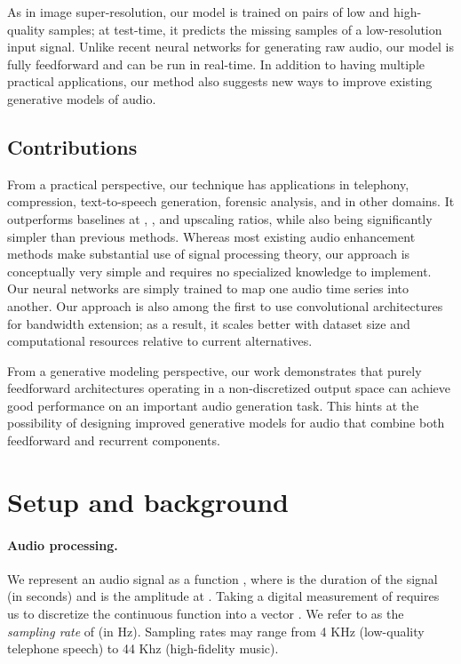 \documentclass{article} \usepackage{iclr2017_workshop,times}
\begin{document}
As in image super-resolution, our model is trained on pairs of low and high-quality samples; at test-time, it predicts the missing samples of a low-resolution input signal. Unlike recent neural networks for generating raw audio, our model is fully feedforward and can be run in real-time. In addition to having multiple practical applications, our method also suggests new ways to improve existing generative models of audio.

\subsection{Contributions}



From a practical perspective, our technique has applications in telephony, compression, text-to-speech generation, forensic analysis, and in other domains. It outperforms baselines at , , and  upscaling ratios, while also being significantly simpler than previous methods. Whereas most existing audio enhancement methods make substantial use of signal processing theory, our approach is conceptually very simple and requires no specialized knowledge to implement. Our neural networks are simply trained to map one audio time series into another. Our approach is also among the first to use convolutional architectures for bandwidth extension; as a result, it scales better with dataset size and computational resources relative to current alternatives.

From a generative modeling perspective, our work demonstrates that purely feedforward architectures operating in a non-discretized output space can achieve good performance on an important audio generation task. 
This hints at the possibility of designing improved generative models for audio that combine both feedforward and recurrent components.

\section{Setup and background}

\paragraph{Audio processing.} 
We represent an audio signal as a function , where  is the duration of the signal (in seconds) and  is the amplitude at . Taking a digital measurement of  requires us to discretize the continuous function  into a vector . We refer to  as the {\em sampling rate} of  (in Hz). Sampling rates may range from 4 KHz (low-quality telephone speech) to 44 Khz (high-fidelity music).
\end{document}
